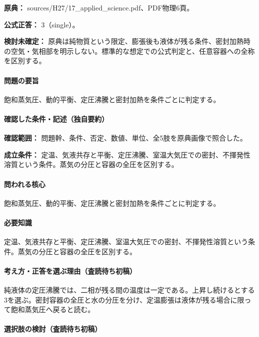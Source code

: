 \noindent\textbf{原典：} sources/H27/17\_applied\_science.pdf、PDF物理6頁。

\textbf{公式正答：} 3（single）。

\par\textbf{検討未確定：} 原典は純物質という限定、膨張後も液体が残る条件、密封加熱時の空気・気相部を明示しない。標準的な想定での公式判定と、任意容器への全称を区別する。

\paragraph{問題の要旨} 飽和蒸気圧、動的平衡、定圧沸騰と密封加熱を条件ごとに判定する。

\paragraph{確認した条件・記述（独自要約）}\mbox{}\par

\noindent\textbf{確認範囲：} 問題幹、条件、否定、数値、単位、全5肢を原典画像で照合した。\par

\noindent\textbf{成立条件：} 定温、気液共存と平衡、定圧沸騰、室温大気圧での密封、不揮発性溶質という条件。蒸気の分圧と容器の全圧を区別する。\par

\paragraph{問われる核心} 飽和蒸気圧、動的平衡、定圧沸騰と密封加熱を条件ごとに判定する。

\paragraph{必要知識} 定温、気液共存と平衡、定圧沸騰、室温大気圧での密封、不揮発性溶質という条件。蒸気の分圧と容器の全圧を区別する。

\paragraph{考え方・正答を選ぶ理由（査読待ち初稿）} 純液体の定圧沸騰では、二相が残る間の温度は一定である。上昇し続けるとする3を選ぶ。密封容器の全圧と水の分圧を分け、定温膨張は液体が残る場合に限って飽和蒸気圧へ戻ると読む。

\paragraph{選択肢の検討（査読待ち初稿）}\mbox{}\par

